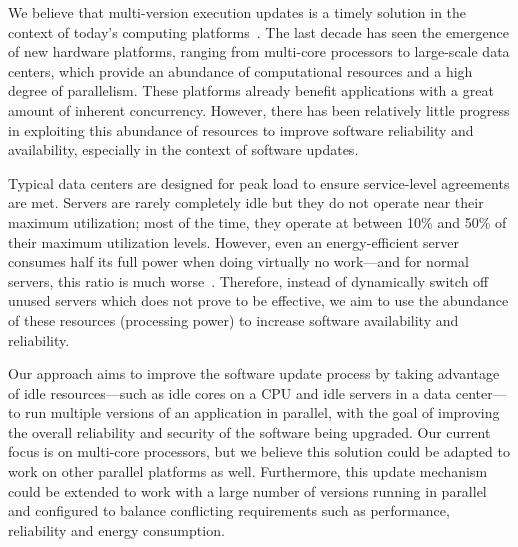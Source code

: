 We believe that multi-version execution updates is a timely solution in the
context of today's computing platforms~\cite{multiplicity}. The last decade has
seen the emergence of new hardware platforms, ranging from multi-core
processors to large-scale data centers, which provide an abundance of
computational resources and a high degree of parallelism. These platforms
already benefit applications with a great amount of inherent concurrency.
However, there has been relatively little progress in exploiting this abundance
of resources to improve software reliability and availability, especially in
the context of software updates.

Typical data centers are designed for peak load to ensure service-level
agreements are met. Servers are rarely completely idle but they do not operate
near their maximum utilization; most of the time, they operate at between 10\%
and 50\% of their maximum utilization levels. However, even an energy-efficient
server consumes half its full power when doing virtually no work---and for
normal servers, this ratio is much worse~\cite{barroso2007}.  Therefore,
instead of dynamically switch off unused servers which does not prove to be
effective, we aim to use the abundance of these resources (\ie processing
power) to increase software availability and reliability.


Our approach aims to improve the software update process by taking advantage of
idle resources---such as idle cores on a CPU and idle servers in a data
center---to run multiple versions of an application in parallel, with the goal
of improving the overall reliability and security of the software being
upgraded.  Our current focus is on multi-core processors, but we believe this
solution could be adapted to work on other parallel platforms as well.
Furthermore, this update mechanism could be extended to work with a large
number of versions running in parallel and configured to balance conflicting
requirements such as performance, reliability and energy consumption.  

